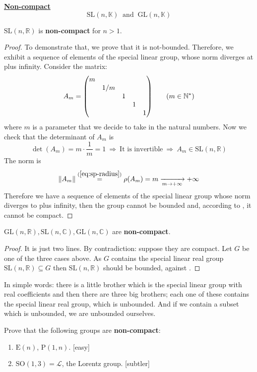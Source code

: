 \documentclass[../main.tex]{subfiles}
\begin{document}
\underline{\textbf{Non-compact}}%
\[
\textrm{SL}(n,\mathbb{K}) \ \textrm{ and }\ \textrm{GL}(n,\mathbb{K})
\]
\begin{lemma}
$\textrm{SL}(n,\mathbb{R})$ is \textbf{non-compact} for $n>1$.
\end{lemma}
\begin{proof}
To demonstrate that, we prove that it is not-bounded. Therefore, we exhibit a sequence of elements of the special linear group, whose norm diverges at plus infinity. Consider the matrix:
\[
A_m=
\mqty(\dmat{m,1/m,1,1,1}) \qquad (m\in\mathbb{N}^\ast)
\]
where $m$ is a parameter that we decide to take in the natural numbers. Now we check that the determinant of $A_m$ is
\[
\det(A_m)=m\cdot\frac{1}{m}=1 \ \Rightarrow \ \textrm{It is invertible} \ \Rightarrow \ A_m\in\textrm{SL}(n,\mathbb{R})
\]
The norm is
\[
\norm{A_m}\overset{(\ref{eq:sp-radius})}{=}\rho(A_m)=m \xrightarrow[m\to+\infty]{}+\infty
\]
Therefore we have a sequence of elements of the special linear group whose norm diverges to plus infinity, then the group cannot be bounded and, according to , it cannot be compact.
\end{proof}
\begin{lemma}
$\textrm{GL}(n,\mathbb{R}),\textrm{SL}(n,\mathbb{C}),\textrm{GL}(n,\mathbb{C})$ are \textbf{non-compact}.
\end{lemma}
\begin{proof}
It is just two lines. By contradiction: suppose they are compact. Let $G$ be one of the three cases above. As $G$ contains the special linear real group $\textrm{SL}(n,\mathbb{R})\subseteq G$ then $\textrm{SL}(n,\mathbb{R})$ should be bounded, against .
\end{proof}
In simple words: there is a little brother which is the special linear group with real coefficients and then there are three big brothers; each one of these contains the special linear real group, which is unbounded. And if we contain a subset which is unbounded, we are unbounded ourselves. 
\begin{exercise}
Prove that the following groups are \textbf{non-compact}:
\begin{enumerate}
    \item $\textrm{E}(n)$, $\textrm{P}(1,n)$.  [easy]
    \item $\textrm{SO}(1,3)=\mathcal{L}$, the Lorentz group. [subtler]
\end{enumerate}
\end{exercise}
\end{document}
